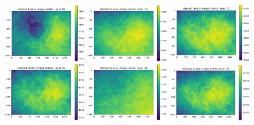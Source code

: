 \documentclass[letterpaper,11pt]{article}
\begin{document}
\begin{figure}[!ht]
\includegraphics[width=0.32\textwidth]{images/measuring_flatfield_corrections/mask_stack_layers/mask_stack_layer_18}
\includegraphics[width=0.32\textwidth]{images/measuring_flatfield_corrections/mask_stack_layers/mask_stack_layer_19}
\includegraphics[width=0.32\textwidth]{images/measuring_flatfield_corrections/mask_stack_layers/mask_stack_layer_22}
\includegraphics[width=0.32\textwidth]{images/measuring_flatfield_corrections/mask_stack_layers/mask_stack_layer_25}
\includegraphics[width=0.32\textwidth]{images/measuring_flatfield_corrections/mask_stack_layers/mask_stack_layer_26}
\includegraphics[width=0.32\textwidth]{images/measuring_flatfield_corrections/mask_stack_layers/mask_stack_layer_29}

\end{figure}
\end{document}
